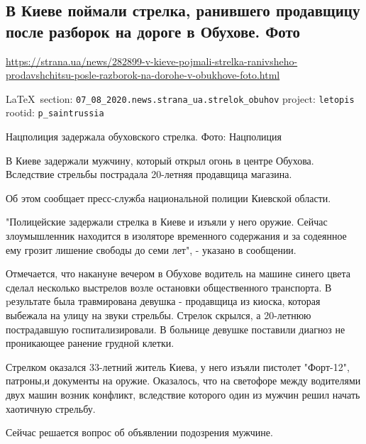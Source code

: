  
 
\subsection{В Киеве поймали стрелка, ранившего продавщицу после разборок на дороге в Обухове. Фото}
\label{sec:07_08_2020.news.strana_ua.strelok_obuhov}
\url{https://strana.ua/news/282899-v-kieve-pojmali-strelka-ranivsheho-prodavshchitsu-posle-razborok-na-dorohe-v-obukhove-foto.html}
  
\vspace{0.5cm}
 {\ifDEBUG\small\LaTeX~section: \verb|07_08_2020.news.strana_ua.strelok_obuhov| project: \verb|letopis| rootid: \verb|p_saintrussia| \fi}
\vspace{0.5cm}

Нацполиция задержала обуховского стрелка. Фото: Нацполиция

В Киеве задержали мужчину, который открыл огонь в центре Обухова. Вследствие
стрельбы пострадала 20-летняя продавщица магазина. 

Об этом сообщает пресс-служба национальной полиции Киевской области.

"Полицейские задержали стрелка в Киеве и изъяли у него оружие. Сейчас
злоумышленник находится в изоляторе временного содержания и за содеянное ему
грозит лишение свободы до семи лет", - указано в сообщении. 

Отмечается, что накануне вечером в Обухове водитель на машине синего цвета
сделал несколько выстрелов возле остановки общественного транспорта. В
pезультате была травмирована девушка - продавщица из киоска, которая выбежала
на улицу на звуки стрельбы. Стрелок скрылся, а 20-летнюю пострадавшую
госпитализировали. В больнице девушке поставили диагноз не проникающее ранение
грудной клетки.

Стрелком оказался 33-летний житель Киева, у него изъяли пистолет "Форт-12",
патроны,и документы на оружие. Оказалось, что на светофоре между водителями
двух машин возник конфликт, вследствие которого один из мужчин решил начать
хаотичную стрельбу. 

Сейчас решается вопрос об объявлении подозрения мужчине. 
